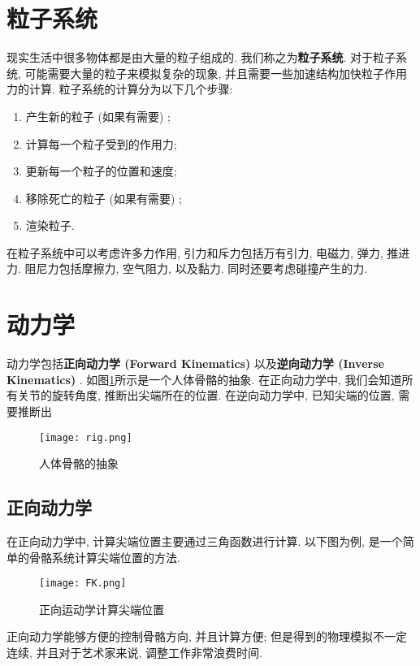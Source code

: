 \section{粒子系统}

现实生活中很多物体都是由大量的粒子组成的. 我们称之为\textbf{粒子系统}. 对于粒子系统, 可能需要大量的粒子来模拟复杂的现象, 并且需要一些加速结构加快粒子作用力的计算. 粒子系统的计算分为以下几个步骤: 
\begin{enumerate}
	\item 产生新的粒子 (如果有需要) ; 
	\item 计算每一个粒子受到的作用力; 
	\item 更新每一个粒子的位置和速度; 
	\item 移除死亡的粒子 (如果有需要) ; 
	\item 渲染粒子. 
\end{enumerate}


在粒子系统中可以考虑许多力作用, 引力和斥力包括万有引力, 电磁力, 弹力, 推进力. 阻尼力包括摩擦力, 空气阻力, 以及黏力. 同时还要考虑碰撞产生的力. 

\section{动力学}

动力学包括\textbf{正向动力学 (Forward Kinematics) }以及\textbf{逆向动力学 (Inverse Kinematics) }. 如图\ref{fig:gg}所示是一个人体骨骼的抽象. 在正向动力学中, 我们会知道所有关节的旋转角度, 推断出尖端所在的位置. 在逆向动力学中, 已知尖端的位置, 需要推断出


\begin{figure}[H]
	\centering
	\texttt{[image: rig.png]}
	\caption{人体骨骼的抽象}
	\label{fig:gg}
\end{figure}

\subsection{正向动力学}

在正向动力学中, 计算尖端位置主要通过三角函数进行计算. 以下图为例, 是一个简单的骨骼系统计算尖端位置的方法. 

\begin{figure}[H]
	\centering
	\texttt{[image: FK.png]}
	\caption{正向运动学计算尖端位置}
	\label{fig:fk}
\end{figure}

正向动力学能够方便的控制骨骼方向, 并且计算方便; 但是得到的物理模拟不一定连续, 并且对于艺术家来说, 调整工作非常浪费时间. 

